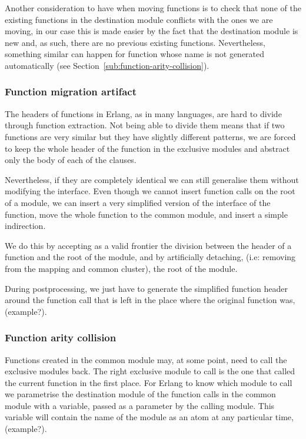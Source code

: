 Another consideration to have when moving functions is to check that
none of the existing functions in the destination module conflicts
with the ones we are moving, in our case this is made easier by the
fact that the destination module is new and, as such, there are no
previous existing functions. Nevertheless, something similar can happen
for function whose name is not generated automatically (see Section~\ref{sub:function-arity-collision}).


\subsubsection{Function migration artifact\label{sub:function-migration-artifact}}

The headers of functions in Erlang, as in many languages, are hard to
divide through function extraction. Not being able to divide them
means that if two functions are very similar but they have slightly
different patterns, we are forced to keep the whole header of the
function in the exclusive modules and abstract only the body of each
of the clauses.

Nevertheless, if they are completely identical we can still generalise
them without modifying the interface. Even though we cannot insert
function calls on the root of a module, we can insert a very simplified
version of the interface of the function, move the whole function to the
common module, and insert a simple indirection.

We do this by accepting as a valid frontier the division between the
header of a function and the root of the module, and by artificially
detaching, (i.e: removing from the mapping and common cluster), the
root of the module.

During postprocessing, we just have to generate the simplified function
header around the function call that is left in the place where the
original function was, (example?).


\subsubsection{Function arity collision\label{sub:function-arity-collision}}

Functions created in the common module may, at some point, need to
call the exclusive modules back. The right exclusive module to call
is the one that called the current function in the first place. For
Erlang to know which module to call we parametrise the destination
module of the function calls in the common module with a variable,
passed as a parameter by the calling module. This variable will contain
the name of the module as an atom at any particular time, (example?).

